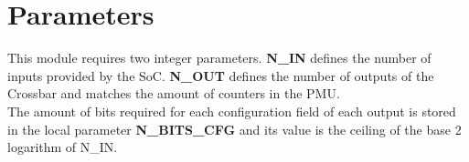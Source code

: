 \section{Parameters}
\label{chapter3}
This module requires two integer parameters. \textbf{N\_IN} defines the number of inputs provided by the SoC.
\textbf{N\_OUT} defines the number of outputs of the Crossbar and matches the amount of counters in the PMU.\\
The amount of bits required for each configuration field of each output is stored in the local parameter \textbf{N\_BITS\_CFG} and its value is the ceiling of the base 2 logarithm of N\_IN.
